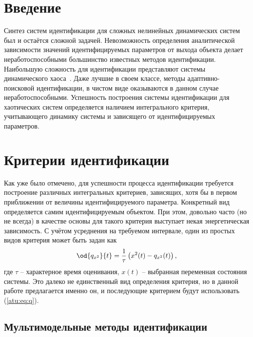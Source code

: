 \documentclass[a4paper,paratype,14pt,fouriernc]{dissatu}
\title{\bookname}
\author{Гуда~А.И.}
\begin{document}
\tableofcontents



\section*{Введение}

Синтез систем идентификации для сложных нелинейных динамических систем
был и остаётся сложной задачей. Невозможность определения
аналитической зависимости значений идентифицируемых параметров
от выхода объекта делает неработоспособными большинство известных
методов идентификации. Наибольшую сложность для идентификации
представляют системы динамического хаоса~\cite{moon_chaotic_vibr,anisch_nonlin_eff,sprott_212}.
Даже лучшие в своем классе, методы адаптивно-поисковой идентификации, %
в чистом виде оказываются в данном случае неработоспособными.
Успешность построения системы идентификации для хаотических
систем определяется наличием интегрального критерия,
учитывающего динамику системы и зависящего от идентифицируемых параметров.


\section*{Критерии идентификации}

Как уже было отмечено, для успешности процесса идентификации требуется
построение различных интегральных критериев, зависящих,
хотя бы в первом приближении
от величины идентифицируемого параметра. Конкретный вид определяется самим идентифицируемым
объектом. При этом, довольно часто (но не всегда) в качестве основы для такого критерия выступает
некая энергетическая зависимость. С учётом усреднения на требуемом интервале,
один из простых видов критерия может быть задан как
%
\begin{equation}
\od{q_{x^2}}{t}
=
\frac{1}{\tau} \left( x^2(t) - q_{x^2}(t) \right)
,
\label{atu:eq:q}
\end{equation}
%
где $\tau$ -- характерное время оценивания, $x(t)$ -- выбранная переменная состояния системы.
Это далеко не единственный вид определения критерия, но в данной работе предлагается именно он,
и последующие критерием будут использовать (\ref{atu:eq:q}).

\subsection*{Мультимодельные методы идентификации}
\end{document}
